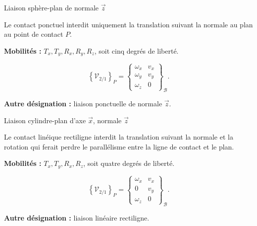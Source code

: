 \begin{TLLiaisonCard}{Liaison sphère-plan de normale \(\vec z\)}
\begin{minipage}[c]{.18\linewidth}\centering
\TLSymSpherePlan
\end{minipage}\hfill
\begin{minipage}[c]{.77\linewidth}
Le contact ponctuel interdit uniquement la translation suivant la normale au
plan au point de contact \(P\).

\textbf{Mobilités :} \(T_x,T_y,R_x,R_y,R_z\), soit cinq degrés de liberté.

\[
\left\{\mathcal V_{2/1}\right\}_P=
\left\{\begin{array}{cc}
\omega_x&v_x\\\omega_y&v_y\\\omega_z&0
\end{array}\right\}_{\mathcal B}.
\]

\textbf{Autre désignation :} liaison ponctuelle de normale \(\vec z\).
\end{minipage}
\end{TLLiaisonCard}

\begin{TLLiaisonCard}{Liaison cylindre-plan d'axe \(\vec x\), normale \(\vec z\)}
\begin{minipage}[c]{.18\linewidth}\centering
\TLSymCylindrePlan
\end{minipage}\hfill
\begin{minipage}[c]{.77\linewidth}
Le contact linéique rectiligne interdit la translation suivant la normale et
la rotation qui ferait perdre le parallélisme entre la ligne de contact et le
plan.

\textbf{Mobilités :} \(T_x,T_y,R_x,R_z\), soit quatre degrés de liberté.

\[
\left\{\mathcal V_{2/1}\right\}_P=
\left\{\begin{array}{cc}
\omega_x&v_x\\0&v_y\\\omega_z&0
\end{array}\right\}_{\mathcal B}.
\]

\textbf{Autre désignation :} liaison linéaire rectiligne.
\end{minipage}
\end{TLLiaisonCard}

